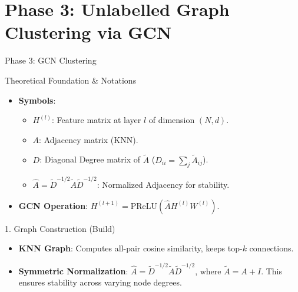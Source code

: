 \documentclass[t]{beamer}
\begin{document}
\section{Phase 3: Unlabelled Graph Clustering via GCN}

\begin{frame}[allowframebreaks]{Phase 3: GCN Clustering}
    \begin{block}{Theoretical Foundation \& Notations}
        \begin{itemize}
            \item \textbf{Symbols}:
                \begin{itemize}

                    \item $H^{(l)}$: Feature matrix at layer $l$ of dimension $(N, d)$.
                    \item $A$: Adjacency matrix (KNN).

                    \item $D$: Diagonal Degree matrix of $\tilde{A}$ ($D_{ii} = \sum_{j} \tilde{A}_{ij}$).
                    \item $\hat{A} = \tilde{D}^{-1/2} \tilde{A} \tilde{D}^{-1/2}$: Normalized Adjacency for stability.

                \end{itemize}
            \item \textbf{GCN Operation}: $H^{(l+1)} = \text{PReLU}(\hat{A} H^{(l)} W^{(l)})$.
        \end{itemize}
    \end{block}

    \begin{block}{1. Graph Construction (Build)}
        \begin{itemize}
            \item \textbf{KNN Graph}: Computes all-pair cosine similarity, keeps top-$k$ connections.
            \item \textbf{Symmetric Normalization}: $\hat{A} = \tilde{D}^{-1/2} \tilde{A} \tilde{D}^{-1/2}$, where $\tilde{A} = A+I$. This ensures stability across varying node degrees.
        \end{itemize}
    \end{block}


\end{frame}
\end{document}
